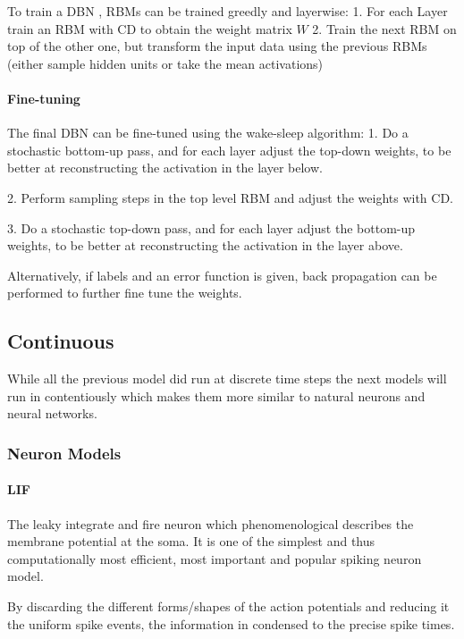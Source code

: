 To train a DBN , RBMs can be trained greedly and layerwise:
1. For each Layer train an RBM with CD to obtain the weight matrix $W$
2. Train the next RBM on top of the other one, but transform the input data using the previous RBMs (either sample hidden units or take the mean activations)


\paragraph{Fine-tuning}

The final DBN can be fine-tuned using the wake-sleep algorithm:
1. Do a stochastic bottom-up pass, and for each layer adjust the top-down weights, to be better at reconstructing the activation in the layer below.

2. Perform sampling steps in the top level RBM and adjust the weights with CD.

3. Do a stochastic top-down pass, and for each layer adjust the bottom-up weights, to be better at reconstructing the activation in the layer above.

Alternatively, if labels and an error function is given, back propagation can be performed to further fine tune the weights.

\subsection{Continuous}

While all the previous model did run at discrete time steps the next models will run in contentiously which makes them more similar to natural neurons and neural networks. 

\subsubsection{Neuron Models}
\paragraph{LIF}

The leaky integrate and fire neuron which phenomenological describes the membrane potential at the soma. 
It is one of the simplest and thus computationally most efficient, most important and popular spiking neuron model.  

By discarding the different forms/shapes of the action potentials and reducing it the uniform spike events, the information in condensed to the precise spike times.

